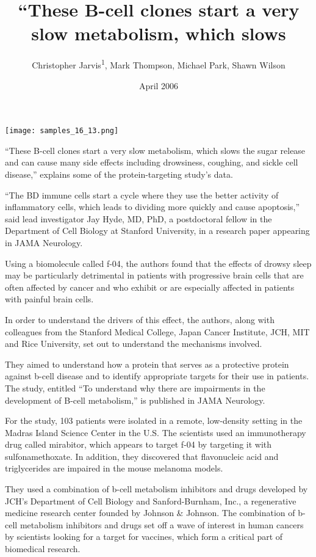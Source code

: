 \documentclass{article}
\title{“These B-cell clones start a very slow metabolism, which slows}
\author{Christopher Jarvis\textsuperscript{1},  Mark Thompson,  Michael Park,  Shawn Wilson}
\affil{\textsuperscript{1}Xi'an Jiaotong-Liverpool University}
\date{April 2006}
\begin{document}
\maketitle

\begin{center}
\begin{minipage}{0.75\linewidth}
\texttt{[image: samples\_16\_13.png]}
\end{minipage}
\end{center}

“These B-cell clones start a very slow metabolism, which slows the sugar release and can cause many side effects including drowsiness, coughing, and sickle cell disease,” explains some of the protein-targeting study’s data.

“The BD immune cells start a cycle where they use the better activity of inflammatory cells, which leads to dividing more quickly and cause apoptosis,” said lead investigator Jay Hyde, MD, PhD, a postdoctoral fellow in the Department of Cell Biology at Stanford University, in a research paper appearing in JAMA Neurology.

Using a biomolecule called f-04, the authors found that the effects of drowsy sleep may be particularly detrimental in patients with progressive brain cells that are often affected by cancer and who exhibit or are especially affected in patients with painful brain cells.

In order to understand the drivers of this effect, the authors, along with colleagues from the Stanford Medical College, Japan Cancer Institute, JCH, MIT and Rice University, set out to understand the mechanisms involved.

They aimed to understand how a protein that serves as a protective protein against b-cell disease and to identify appropriate targets for their use in patients. The study, entitled “To understand why there are impairments in the development of B-cell metabolism,” is published in JAMA Neurology.

For the study, 103 patients were isolated in a remote, low-density setting in the Madras Island Science Center in the U.S. The scientists used an immunotherapy drug called mirabitor, which appears to target f-04 by targeting it with sulfonamethoxate. In addition, they discovered that flavonucleic acid and triglycerides are impaired in the mouse melanoma models.

They used a combination of b-cell metabolism inhibitors and drugs developed by JCH’s Department of Cell Biology and Sanford-Burnham, Inc., a regenerative medicine research center founded by Johnson \& Johnson. The combination of b-cell metabolism inhibitors and drugs set off a wave of interest in human cancers by scientists looking for a target for vaccines, which form a critical part of biomedical research.
\end{document}
